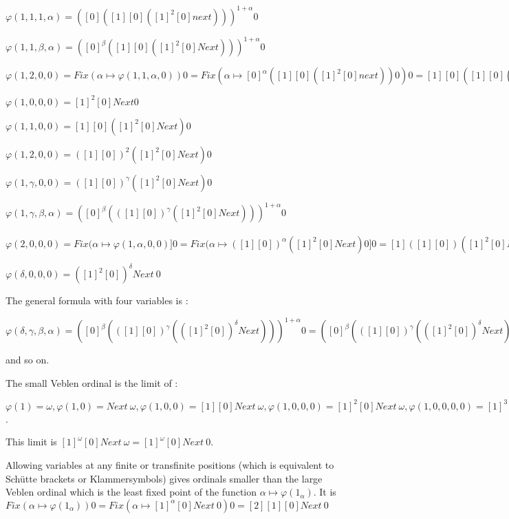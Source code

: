 \documentclass[10pt]{article}
\begin{document}
\( \varphi(1,1,1,\alpha) = ([0] ([1] [0] ([1]^2 [0] next)))^{1+\alpha} 0 \)

\( \varphi(1,1,\beta,\alpha) = ([0]^\beta ([1] [0] ([1]^2 [0] Next)))^{1+\alpha} 0 \)

\( \varphi(1,2,0,0) = Fix (\alpha \mapsto \varphi(1,1,\alpha,0)) 0 = Fix (\alpha \mapsto [0]^\alpha ([1] [0] ([1]^2 [0] next)) 0) 0 = [1] [0] ([1] [0] ([1]^2 [0] Next)) 0 = ([1] [0])^2 ([1]^2 [0] Next) 0 \)

\( \varphi(1,0,0,0) = [1]^2 [0] Next 0 \)

\( \varphi(1,1,0,0) = [1] [0] ([1]^2 [0] Next) 0 \)

\( \varphi(1,2,0,0) = ([1] [0])^2 ([1]^2 [0] Next) 0 \)

\( \varphi(1,\gamma,0,0) = ([1] [0])^\gamma ([1]^2 [0] Next) 0 \)

\( \varphi(1,\gamma,\beta,\alpha) = ([0]^\beta (([1] [0])^\gamma ([1]^2 [0] Next)))^{1+\alpha} 0 \)

\( \varphi(2,0,0,0) = Fix (\alpha \mapsto \varphi(1,\alpha,0,0)] 0 = Fix (\alpha \mapsto ([1] [0])^\alpha ([1]^2 [0] Next) 0] 0 = [1] ([1] [0]) ([1]^2 [0] Next) 0 = [1]^2 [0] ([1]^2 [0] Next) 0 = ([1]^2 [0])^2 Next 0 \)

\( \varphi(\delta,0,0,0) = ([1]^2 [0])^\delta Next\ 0 \)

The general formula with four variables is : 

\( \varphi(\delta,\gamma,\beta,\alpha) = ([0]^\beta (([1] [0])^\gamma (([1]^2 [0])^\delta Next)))^{1+\alpha} 0 = ([0]^\beta (([1] [0])^\gamma (([1]^2 [0])^\delta Next)))^{1+\alpha} \omega \) 

and so on.

\bigskip

The small Veblen ordinal is the limit of :

 \( \varphi(1) = \omega, \varphi(1,0) = Next\ \omega, \varphi(1,0,0) = [1] [0] Next\ \omega, \varphi(1,0,0,0) = [1]^2 [0] Next\ \omega, \varphi(1,0,0,0,0) = [1]^3 [0] Next\ \omega, \ldots \). 

This limit is \( [1]^\omega [0] Next\ \omega = [1]^\omega [0] Next\ 0 \).

\bigskip

Allowing variables at any finite or transfinite positions (which is equivalent to Schütte brackets or Klammersymbols) gives ordinals smaller than the large Veblen ordinal which is the least fixed point of the function \( \alpha \mapsto \varphi(1_\alpha) \). It is \( Fix (\alpha \mapsto \varphi(1_\alpha)) 0 = Fix (\alpha \mapsto [1]^\alpha [0] Next\ 0) 0 = [2] [1] [0] Next\ 0 \)
\end{document}
